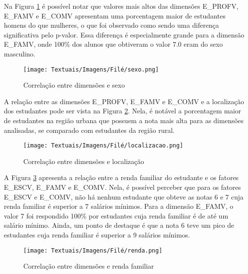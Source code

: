  Na Figura \ref{fig:sexo} é possível notar que valores mais altos das dimensões E\_PROFV, E\_FAMV e E\_COMV apresentam uma porcentagem maior de estudantes homens do que mulheres, o que foi observado como sendo uma diferença significativa pelo p-valor. Essa diferença é especialmente grande para a dimensão E\_FAMV, onde 100\% dos alunos que obtiveram o valor 7.0 eram do sexo masculino.


\begin{figure}[ht!]
    \centering
    \caption{Correlação entre dimensões e sexo}
    \texttt{[image: Textuais/Imagens/Filé/sexo.png]}
    \label{fig:sexo}
\end{figure}


A relação entre as dimensões E\_PROFV, E\_FAMV e E\_COMV e a localização dos estudantes pode ser vista na Figura \ref{fig:localizacao_dimensao}. Nela, é notável a porcentagem maior de estudantes na região urbana que possuem a nota mais alta para as dimensões analisadas, se comparado com estudantes da região rural.

\begin{figure}[ht!]
    \centering
    \caption{Correlação entre dimensões e localização}
    \texttt{[image: Textuais/Imagens/Filé/localizacao.png]}
    \label{fig:localizacao_dimensao}
\end{figure}

A Figura \ref{fig:renda-dimensoes} apresenta a relação entre a renda familiar do estudante e os fatores E\_ESCV, E\_FAMV e E\_COMV. Nela, é possível perceber que para os fatores E\_ESCV e E\_COMV, não há nenhum estudante que obteve as notas 6 e 7 cuja renda familiar é superior a 7 salários mínimos. Para a dimensão E\_FAMV, o valor 7 foi respondido 100\% por estudantes cuja renda familiar é de até um salário mínimo. Ainda, um ponto de destaque é que a nota 6 teve um pico de estudantes cuja renda familiar é superior a 9 salários mínimos.


\begin{figure}[ht!]
    \centering
    \caption{Correlação entre dimensões e renda familiar}
    \texttt{[image: Textuais/Imagens/Filé/renda.png]}
    \label{fig:renda-dimensoes}
\end{figure}

